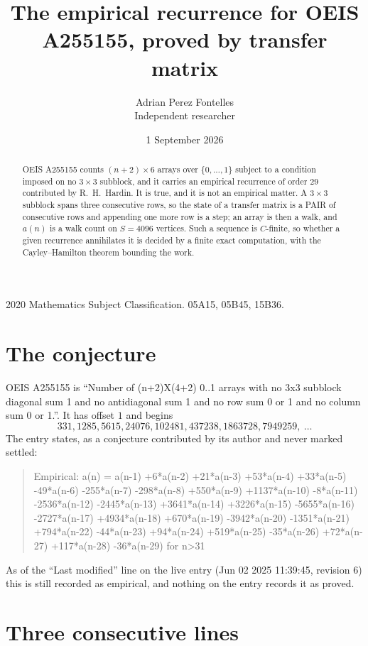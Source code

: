 \documentclass[11pt,a4paper]{article}
\title{The empirical recurrence for OEIS A255155, proved by transfer matrix}
\author{Adrian Perez Fontelles\\ \small Independent researcher}
\date{1 September 2026}
\theoremstyle{plain}
\theoremstyle{definition}
\begin{document}
\maketitle

\begin{abstract}
OEIS A255155 counts $(n+2)\times6$ arrays over $\{0,\dots,1\}$ subject to a condition imposed on
no $3\times3$ subblock, and it carries an empirical recurrence of order $29$
contributed by R.~H.~Hardin. It is true, and it is not an empirical matter. A $3\times3$
subblock spans three consecutive rows, so the state of a transfer matrix is a PAIR of
consecutive rows and appending one more row is a step; an array is then a walk, and
$a(n)$ is a walk count on $S=4096$ vertices. Such a sequence is $C$-finite, so whether a given
recurrence annihilates it is decided by a finite exact computation, with the Cayley--Hamilton
theorem bounding the work.
\end{abstract}

\noindent\small 2020 Mathematics Subject Classification. 05A15, 05B45, 15B36.\normalsize

\section{The conjecture}

OEIS A255155 is ``Number of (n+2)X(4+2) 0..1 arrays with no 3x3 subblock diagonal sum 1 and no antidiagonal sum 1 and no row sum 0 or 1 and no column sum 0 or 1.''. It has offset $1$ and begins
\[
331, 1285, 5615, 24076, 102481, 437238, 1863728, 7949259,\ \dots
\]
The entry states, as a conjecture contributed by its author and never marked settled:
\begin{quote}
Empirical: a(n) = a(n-1) +6*a(n-2) +21*a(n-3) +53*a(n-4) +33*a(n-5) -49*a(n-6) -255*a(n-7) -298*a(n-8) +550*a(n-9) +1137*a(n-10) -8*a(n-11) -2536*a(n-12) -2445*a(n-13) +3641*a(n-14) +3226*a(n-15) -5655*a(n-16) -2727*a(n-17) +4934*a(n-18) +670*a(n-19) -3942*a(n-20) -1351*a(n-21) +794*a(n-22) -44*a(n-23) +94*a(n-24) +519*a(n-25) -35*a(n-26) +72*a(n-27) +117*a(n-28) -36*a(n-29) for n>31
\end{quote}
As of the ``Last modified'' line on the live entry (Jun 02 2025 11:39:45, revision 6) this is still
recorded as empirical, and nothing on the entry records it as proved.

\section{Three consecutive lines}
\end{document}
